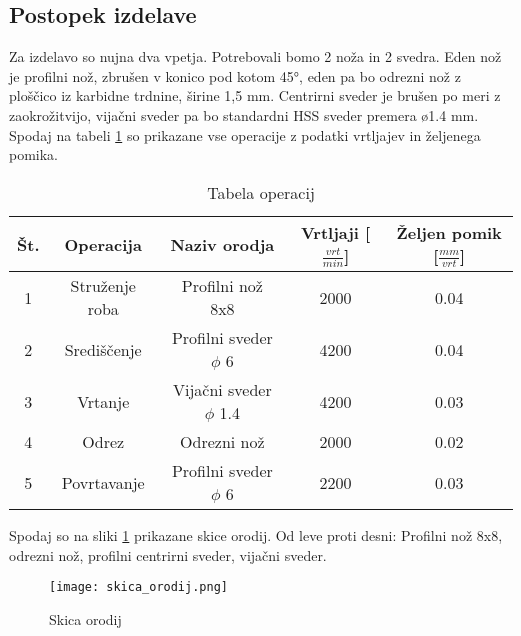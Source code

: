 \subsection{Postopek izdelave}
Za izdelavo so nujna dva vpetja. Potrebovali bomo 2 noža in 2
svedra. Eden nož je profilni nož, zbrušen v konico pod kotom 45°, eden pa
bo odrezni nož z ploščico iz karbidne trdnine, širine 1,5 mm.
Centrirni sveder je brušen po meri z zaokrožitvijo, vijačni
sveder pa bo standardni HSS sveder premera ø1.4 mm. Spodaj na tabeli \ref{tabela_operacij}
so prikazane vse operacije z podatki vrtljajev in željenega pomika.

\begin{table}[H]
	\caption{Tabela operacij}
	\label{tabela_operacij}
	\begin{center}
		\begin{tabular}{|c|c|c|c|c|}
			\hline
			Št. & Operacija      & Naziv orodja              & Vrtljaji [\( \frac{vrt}{min}\)] & Željen pomik [\( \frac{mm}{vrt}\)] \\
			\hline
			1   & Struženje roba & Profilni nož 8x8          & 2000                            & 0.04                               \\
			\hline
			2   & Središčenje    & Profilni sveder $\phi$ 6  & 4200                            & 0.04                               \\
			\hline
			3   & Vrtanje        & Vijačni sveder $\phi$ 1.4 & 4200                            & 0.03                               \\
			\hline
			4   & Odrez          & Odrezni nož               & 2000                            & 0.02                               \\
			\hline
			5   & Povrtavanje    & Profilni sveder $\phi$ 6  & 2200                            & 0.03                               \\
			\hline
		\end{tabular}
	\end{center}

\end{table}

Spodaj so na sliki \ref{skica_orodij} prikazane skice orodij.  Od leve proti desni: Profilni nož 8x8,
odrezni nož, profilni centrirni sveder, vijačni sveder.

\begin{figure}[H]
	\begin{center}
		\texttt{[image: skica\_orodij.png]}
		\caption{Skica orodij
			\cite{lasten}}
		\label{skica_orodij}
	\end{center}
\end{figure}

